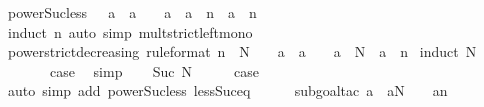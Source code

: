 \begin{isabellebody}
\isamarkupfalse%
\ power{\isacharunderscore}{\kern0pt}Suc{\isacharunderscore}{\kern0pt}less{\isacharcolon}{\kern0pt}\ {\isachardoublequoteopen}{}\ {\isacharless}{\kern0pt}\ a\ {\isasymLongrightarrow}\ a\ {\isacharless}{\kern0pt}\ {}\ {\isasymLongrightarrow}\ a\ {\isacharasterisk}{\kern0pt}\ a\ {\isacharcircum}{\kern0pt}\ n\ {\isacharless}{\kern0pt}\ a\ {\isacharcircum}{\kern0pt}\ n{\isachardoublequoteclose}\isanewline
%
\isadelimproof
\ \ %
\endisadelimproof
%
\isatagproof
{}\isamarkupfalse%
\ {\isacharparenleft}{\kern0pt}induct\ n{\isacharparenright}{\kern0pt}\ {\isacharparenleft}{\kern0pt}auto\ simp{\isacharcolon}{\kern0pt}\ mult{\isacharunderscore}{\kern0pt}strict{\isacharunderscore}{\kern0pt}left{\isacharunderscore}{\kern0pt}mono{\isacharparenright}{\kern0pt}%
\endisatagproof
{\isafoldproof}%
%
\isadelimproof
\isanewline
%
\endisadelimproof
\isanewline
{}\isamarkupfalse%
\ power{\isacharunderscore}{\kern0pt}strict{\isacharunderscore}{\kern0pt}decreasing\ {\isacharbrackleft}{\kern0pt}rule{\isacharunderscore}{\kern0pt}format{\isacharbrackright}{\kern0pt}{\isacharcolon}{\kern0pt}\ {\isachardoublequoteopen}n\ {\isacharless}{\kern0pt}\ N\ {\isasymLongrightarrow}\ {}\ {\isacharless}{\kern0pt}\ a\ {\isasymLongrightarrow}\ a\ {\isacharless}{\kern0pt}\ {}\ {\isasymlongrightarrow}\ a\ {\isacharcircum}{\kern0pt}\ N\ {\isacharless}{\kern0pt}\ a\ {\isacharcircum}{\kern0pt}\ n{\isachardoublequoteclose}\isanewline
%
\isadelimproof
%
\endisadelimproof
%
\isatagproof
{}\isamarkupfalse%
\ {\isacharparenleft}{\kern0pt}induct\ N{\isacharparenright}{\kern0pt}\isanewline
\ \ \isamarkupfalse%
\ {}\isanewline
\ \ \isamarkupfalse%
\ \isamarkupfalse%
\ {\isacharquery}{\kern0pt}case\ \isamarkupfalse%
\ simp\isanewline
{}\isamarkupfalse%
\isanewline
\ \ \isamarkupfalse%
\ {\isacharparenleft}{\kern0pt}Suc\ N{\isacharparenright}{\kern0pt}\isanewline
\ \ \isamarkupfalse%
\ \isamarkupfalse%
\ {\isacharquery}{\kern0pt}case\isanewline
\ \ \ \ \isamarkupfalse%
\ {\isacharparenleft}{\kern0pt}auto\ simp\ add{\isacharcolon}{\kern0pt}\ power{\isacharunderscore}{\kern0pt}Suc{\isacharunderscore}{\kern0pt}less\ less{\isacharunderscore}{\kern0pt}Suc{\isacharunderscore}{\kern0pt}eq{\isacharparenright}{\kern0pt}\isanewline
\ \ \ \ \isamarkupfalse%
\ {\isacharparenleft}{\kern0pt}subgoal{\isacharunderscore}{\kern0pt}tac\ {\isachardoublequoteopen}a\ {\isacharasterisk}{\kern0pt}\ a{\isacharcircum}{\kern0pt}N\ {\isacharless}{\kern0pt}\ {}\ {\isacharasterisk}{\kern0pt}\ a{\isacharcircum}{\kern0pt}n{\isachardoublequoteclose}{\isacharparenright}{\kern0pt}\isanewline

\end{isabellebody}
